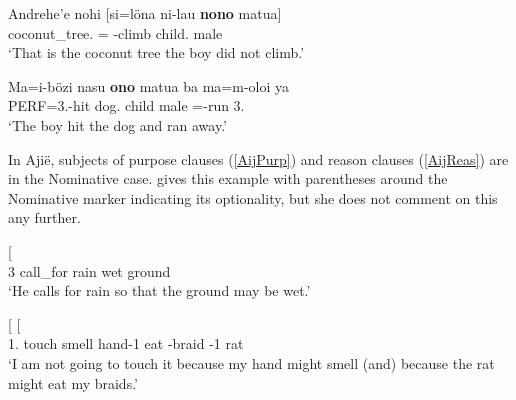 \begin{exe}\ex\label{NiaA}
\begin{xlist} 
\ex\label{NiaRelA}\gll Andrehe'e  nohi                 {\rm[}si=l\"ona ni-lau \textbf{nono} matua{\rm]}\\
                       \dist{}    coconut\_tree.\mut{} \hspaceThis{[}\relativ{}=\Neg{} \pass{}-climb child.\mut{} male\\
\glt`That is the coconut tree the boy did not climb.'

\ex\label{NiaMainA}\gll Ma=i-b\"ozi nasu \textbf{ono} matua ba ma=m-oloi ya\\
PERF=3\sg{}.\rls{}-hit dog.\mut{} child male \conj{} \pfv{}=\dyn{}-run 3\sg{}.\mut{}\\
\glt `The boy hit the dog and ran away.'
\end{xlist}%
\end{exe}


In Aji\"e, subjects of purpose clauses (\ref{AijPurp}) and reason  clauses (\ref{AijReas}) are in the Nominative  case. 
 gives this example with parentheses around the Nominative marker indicating its optionality, but she does not comment on this any further.

\begin{exe}\ex\label{AijDep}
\begin{xlist}
\ex\label{AijPurp}\gll{}    {\rm[}   \textbf{} \textipa{ne\textbardotlessj 2\textglotstop}{\rm]}\\
                      3\sg{}       call\_for     rain                       \hspaceThis{[}\purp{} \Hyp{} wet \nom{} ground\\
\glt `He calls for rain so that the ground may be wet.' %

\ex\label{AijReas}\gll{}    {\rm[}   \textbf{} \textipa{kOwi-\textltailn}{\rm]}  {\rm[}     \textbf{} \textipa{yiipu}{\rm]}\\
1\sg{}.\prosp{} \Neg{} touch \reas{} \dubt{} smell \nom{} hand-1\sg{} \reas{} \dubt{} eat \coll{}-braid \poss{}-1\sg{} \nom{} rat\\
\glt `I am not going to touch it because my hand might smell (and) because the rat might eat my braids.'%
\end{xlist}
\end{exe}

